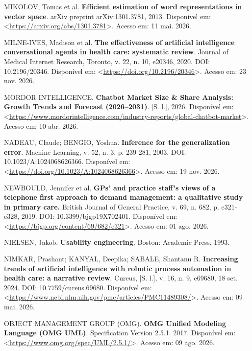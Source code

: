 \documentclass[12pt,a4paper]{extarticle}
\begin{document}
\vspace{0.5cm}\noindent
MIKOLOV, Tomas et al. \textbf{Efficient estimation of word representations in vector space}. arXiv preprint arXiv:1301.3781, 2013. Disponível em: <\url{https://arxiv.org/abs/1301.3781}>. Acesso em: 11 mai. 2026.

\vspace{0.5cm}\noindent
MILNE-IVES, Madison et al. \textbf{The effectiveness of artificial intelligence conversational agents in health care: systematic review}. Journal of Medical Internet Research, Toronto, v. 22, n. 10, e20346, 2020. DOI: 10.2196/20346. Disponível em: <\url{https://doi.org/10.2196/20346}>. Acesso em: 23 nov. 2026.

\vspace{0.5cm}\noindent
MORDOR INTELLIGENCE. \textbf{Chatbot Market Size \& Share Analysis: Growth Trends and Forecast (2026--2031)}. [S. l.], 2026. Disponível em: <\url{https://www.mordorintelligence.com/industry-reports/global-chatbot-market}>. Acesso em: 10 abr. 2026.

\vspace{0.5cm}\noindent
NADEAU, Claude; BENGIO, Yoshua. \textbf{Inference for the generalization error}. Machine Learning, v. 52, n. 3, p. 239-281, 2003. DOI: 10.1023/A:1024068626366. Disponível em: <\url{https://doi.org/10.1023/A:1024068626366}>. Acesso em: 19 nov. 2026.

\vspace{0.5cm}\noindent
NEWBOULD, Jennifer et al. \textbf{GPs' and practice staff's views of a telephone first approach to demand management: a qualitative study in primary care.} British Journal of General Practice, v. 69, n. 682, p. e321-e328, 2019. DOI: 10.3399/bjgp19X702401. Disponível em: <\url{https://bjgp.org/content/69/682/e321}>. Acesso em: 01 ago. 2026.

\vspace{0.5cm}\noindent
NIELSEN, Jakob. \textbf{Usability engineering}. Boston: Academic Press, 1993.

\vspace{0.5cm}\noindent
NIMKAR, Prashant; KANYAL, Deepika; SABALE, Shantanu R. \textbf{Increasing trends of artificial intelligence with robotic process automation in health care: a narrative review}. Cureus, [S. l.], v. 16, n. 9, e69680, 18 set. 2024. DOI: 10.7759/cureus.69680. Disponível em: <\url{https://www.ncbi.nlm.nih.gov/pmc/articles/PMC11489308/}>. Acesso em: 09 mai. 2026.

\vspace{0.5cm}\noindent
OBJECT MANAGEMENT GROUP (OMG). \textbf{OMG Unified Modeling Language (OMG UML)}. Specification Version 2.5.1. 2017. Disponível em: <\url{https://www.omg.org/spec/UML/2.5.1/}>. Acesso em: 09 ago. 2026.
\end{document}
